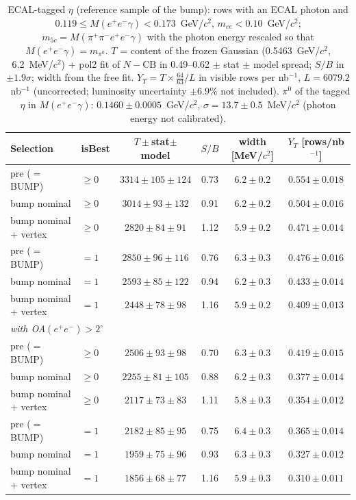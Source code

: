 \begin{table}[H]
\centering\small
\setlength{\tabcolsep}{4pt}
\caption{ECAL-tagged $\eta$ (reference sample of the bump): rows with an ECAL photon and $0.119\leq M(e^+e^-\gamma)<0.173$~GeV/$c^2$, $m_{ee}<0.10$~GeV/$c^2$; $m_{5c}=M(\pi^+\pi^-e^+e^-\gamma)$ with the photon energy rescaled so that $M(e^+e^-\gamma)=m_{\pi^0}$. $T$ = content of the frozen Gaussian (0.5463~GeV/$c^2$, 6.2~MeV/$c^2$) + pol2 fit of $N-\mathrm{CB}$ in 0.49--0.62 $\pm$ stat $\pm$ model spread; $S/B$ in $\pm1.9\sigma$; width from the free fit. $Y_T=T\times\frac{64}{63}/L$ in visible rows per nb$^{-1}$, $L=6079.2$~nb$^{-1}$ (uncorrected; luminosity uncertainty $\pm6.9$\% not included). $\pi^0$ of the tagged $\eta$ in $M(e^+e^-\gamma)$: $0.1460\pm0.0005$~GeV/$c^2$, $\sigma=13.7\pm0.5$~MeV/$c^2$ (photon energy not calibrated).}
\label{tab:res_tagged}
\begin{tabular}{llcccc}
\toprule
Selection & isBest & $T\pm$stat$\pm$model & $S/B$ & width [MeV/$c^2$] & $Y_T$ [rows/nb$^{-1}$] \\
\midrule
pre ($=$ BUMP) & $\geq0$ & $3314\pm105\pm124$ & 0.73 & $6.2\pm0.2$ & $0.554\pm0.018$ \\
bump nominal & $\geq0$ & $3014\pm93\pm132$ & 0.91 & $6.2\pm0.2$ & $0.504\pm0.016$ \\
bump nominal + vertex & $\geq0$ & $2820\pm84\pm91$ & 1.12 & $5.9\pm0.2$ & $0.471\pm0.014$ \\
pre ($=$ BUMP) & $=1$ & $2850\pm96\pm116$ & 0.76 & $6.3\pm0.3$ & $0.476\pm0.016$ \\
bump nominal & $=1$ & $2593\pm85\pm122$ & 0.94 & $6.2\pm0.3$ & $0.433\pm0.014$ \\
bump nominal + vertex & $=1$ & $2448\pm78\pm98$ & 1.16 & $5.9\pm0.2$ & $0.409\pm0.013$ \\
\midrule
\multicolumn{6}{l}{\emph{with OA$(e^+e^-)>2^\circ$}} \\
pre ($=$ BUMP) & $\geq0$ & $2506\pm93\pm98$ & 0.70 & $6.3\pm0.3$ & $0.419\pm0.015$ \\
bump nominal & $\geq0$ & $2255\pm81\pm105$ & 0.88 & $6.2\pm0.3$ & $0.377\pm0.014$ \\
bump nominal + vertex & $\geq0$ & $2117\pm73\pm83$ & 1.11 & $5.8\pm0.3$ & $0.354\pm0.012$ \\
pre ($=$ BUMP) & $=1$ & $2182\pm85\pm95$ & 0.75 & $6.4\pm0.3$ & $0.365\pm0.014$ \\
bump nominal & $=1$ & $1959\pm75\pm96$ & 0.93 & $6.3\pm0.3$ & $0.327\pm0.012$ \\
bump nominal + vertex & $=1$ & $1856\pm68\pm77$ & 1.16 & $5.9\pm0.3$ & $0.310\pm0.011$ \\
\bottomrule
\end{tabular}
\end{table}
